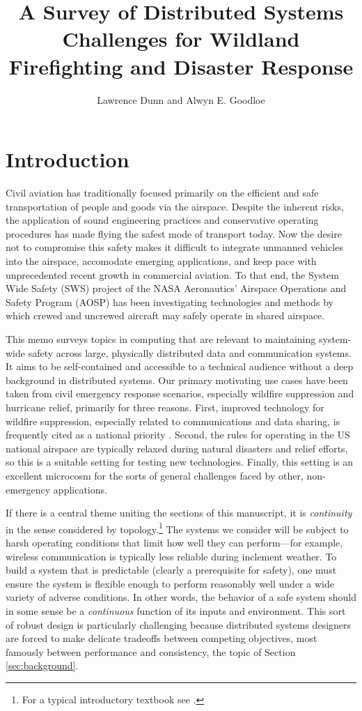 \documentclass[]             %
{NASA}                       %
\title{A Survey of Distributed Systems Challenges for Wildland
  Firefighting and Disaster Response}
\author{Lawrence Dunn and Alwyn E. Goodloe}
\theoremstyle{definition}
\begin{document}
\newpage
\setcounter{tocdepth}{2}
\tableofcontents
\newpage

\section{Introduction}
\label{introduction}
Civil aviation has traditionally focused primarily on the efficient
and safe transportation of people and goods via the airspace. Despite
the inherent risks, the application of sound engineering practices and
conservative operating procedures has made flying the safest mode of
transport today. Now the desire not to compromise this safety makes it
difficult to integrate unmanned vehicles into the airspace, accomodate
emerging applications, and keep pace with unprecedented recent growth
in commercial aviation. To that end, the System Wide Safety (SWS)
project of the NASA Aeronautics' Airspace Operations and Safety
Program (AOSP) has been investigating technologies and methods by
which crewed and uncrewed aircraft may safely operate in shared
airspace.

This memo surveys topics in computing that are relevant to maintaining
system-wide safety across large, physically distributed data and
communication systems. It aims to be self-contained and accessible to
a technical audience without a deep background in distributed
systems. Our primary motivating use cases have been taken from civil
emergency response scenarios, especially wildfire suppression and
hurricane relief, primarily for three reasons. First, improved
technology for wildfire suppression, especially related to
communications and data sharing, is frequently cited as a national
priority \cite{pcast2023}.  Second, the rules for operating in the US
national airspace are typically relaxed during natural disasters and
relief efforts, so this is a suitable setting for testing new
technologies. Finally, this setting is an excellent microcosm for the
sorts of general challenges faced by other, non-emergency
applications.

If there is a central theme uniting the sections of this manuscript,
it is \emph{continuity} in the sense considered by
topology.\footnote{For a typical introductory textbook see
  \cite{mendelson2012introduction}.} The systems we consider will be
subject to harsh operating conditions that limit how well they can
perform---for example, wireless communication is typically less
reliable during inclement weather. To build a system that is
predictable (clearly a prerequisite for safety), one must ensure the
system is flexible enough to perform reasonably well under a wide
variety of adverse conditions. In other words, the behavior of a safe
system should in some sense be a \emph{continuous} function of its
inputs and environment. This sort of robust design is particularly
challenging because distributed systems designers are forced to make
delicate tradeoffs between competing objectives, most famously between
performance and consistency, the topic of Section
\ref{sec:background}.
\end{document}
